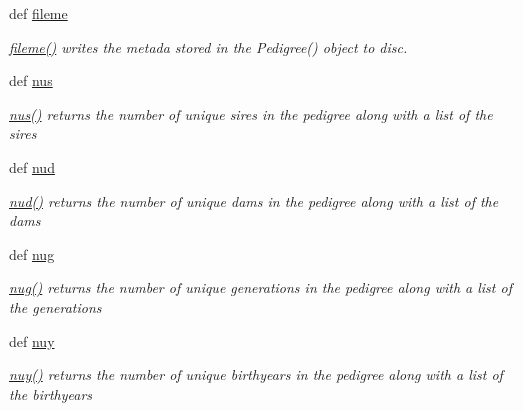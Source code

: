 \begin{DoxyCompactItemize}
def \hyperlink{classPyPedal_1_1pyp__newclasses_1_1PedigreeMetadata_a8af37f0f55bc77dca77228986185fbe7}{fileme}
\begin{DoxyCompactList}\small\item\em \hyperlink{classPyPedal_1_1pyp__newclasses_1_1PedigreeMetadata_a8af37f0f55bc77dca77228986185fbe7}{fileme()} writes the metada stored in the Pedigree() object to disc. \item\end{DoxyCompactList}\item 
def \hyperlink{classPyPedal_1_1pyp__newclasses_1_1PedigreeMetadata_aab430a7cc66838ce6f75a80fa8fd2884}{nus}
\begin{DoxyCompactList}\small\item\em \hyperlink{classPyPedal_1_1pyp__newclasses_1_1PedigreeMetadata_aab430a7cc66838ce6f75a80fa8fd2884}{nus()} returns the number of unique sires in the pedigree along with a list of the sires \item\end{DoxyCompactList}\item 
def \hyperlink{classPyPedal_1_1pyp__newclasses_1_1PedigreeMetadata_a9330d9f4d5d9ce616a57db3b8fae95b1}{nud}
\begin{DoxyCompactList}\small\item\em \hyperlink{classPyPedal_1_1pyp__newclasses_1_1PedigreeMetadata_a9330d9f4d5d9ce616a57db3b8fae95b1}{nud()} returns the number of unique dams in the pedigree along with a list of the dams \item\end{DoxyCompactList}\item 
def \hyperlink{classPyPedal_1_1pyp__newclasses_1_1PedigreeMetadata_a41af77f90422ded81869fd3f2a8a80f9}{nug}
\begin{DoxyCompactList}\small\item\em \hyperlink{classPyPedal_1_1pyp__newclasses_1_1PedigreeMetadata_a41af77f90422ded81869fd3f2a8a80f9}{nug()} returns the number of unique generations in the pedigree along with a list of the generations \item\end{DoxyCompactList}\item 
def \hyperlink{classPyPedal_1_1pyp__newclasses_1_1PedigreeMetadata_a7f51c5a6914509ec324afde82f245253}{nuy}
\begin{DoxyCompactList}\small\item\em \hyperlink{classPyPedal_1_1pyp__newclasses_1_1PedigreeMetadata_a7f51c5a6914509ec324afde82f245253}{nuy()} returns the number of unique birthyears in the pedigree along with a list of the birthyears \item\end{DoxyCompactList}\item 

\end{DoxyCompactItemize}
